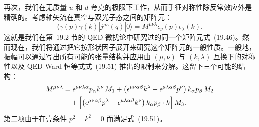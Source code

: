 再次，我们在无质量 $u$ 和 $d$ 夸克的极限下工作，从而手征对称性除反常效应外是精确的。考虑轴矢流在真空与双光子态之间的矩阵元：
\begin{equation}
  \langle \gamma(p)\gamma(k)|j^{\mu 5}(q)|0\rangle = M^{\mu\nu\lambda}
    \epsilon_\nu(p)\epsilon_\lambda(k) .
  \label{eq:19.109}
\end{equation}
这就是我们在第~19.2 节的 QED 微扰论中研究过的同一个矩阵元式~(19.46)。然而现在，我们将通过把它按形状因子展开来研究这个矩阵元的一般性质。一般地，振幅可以通过写出所有可能的张量结构并应用由 $(\mu,\nu)$ 与 $(k,\lambda)$ 互换下的对称性以及 QED Ward 恒等式式~(19.51) 推出的限制来分解。这留下三个可能的结构：
\begin{equation}
  \begin{aligned}
    M^{\mu\nu\lambda} &= \epsilon^{\mu\nu\lambda\alpha} p_\alpha k^\nu\,
      M_1 + \bigl( \epsilon^{\mu\nu\alpha\beta}k^\lambda - \epsilon^{\mu\lambda
        \alpha\beta}p^\nu \bigr)\,k_\alpha p_\beta\,M_2\\
    &\quad + \Bigl[ \bigl( \epsilon^{\mu\nu\alpha\beta}p^\lambda
      - \epsilon^{\mu\lambda\alpha\beta}k^\nu \bigr)\,k_\alpha p_\beta
      \cdot k \Bigr]\,M_3 .
  \end{aligned}
  \label{eq:19.110}
\end{equation}
第二项由于在壳条件 $p^2 = k^2 = 0$ 而满足式~(19.51)。

